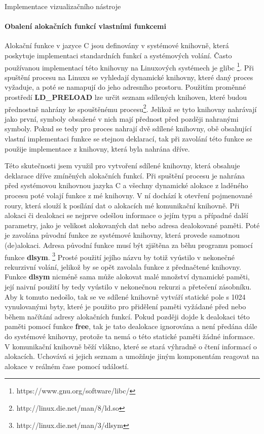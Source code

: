 \documentclass[czech,bachelor,male,python,dept460]{diploma}						%
\newcommand{\parspace}[1][]{
	\ifthenelse{\isempty{#1}}{\vspace{5mm}}{\vspace{#1}}
	\par
}
\begin{document}
\begin{section}{Implementace vizualizačního nástroje}
				\paragraph*{Obalení alokačních funkcí vlastními funkcemi} Alokační funkce v jazyce C jsou definovány v systémové knihovně, která poskytuje
				implementaci standardních funkcí a systémových volání. Často používanou implementací této knihovny na Linuxových systémech je glibc
				\footnote{https://www.gnu.org/software/libc/}. Při spuštění procesu na Linuxu se vyhledají dynamické knihovny, které daný proces vyžaduje,
				a poté se namapují do jeho adresního prostoru. Použitím proměnné prostředí \textbf{LD\_PRELOAD} lze určit
				seznam sdílených knihoven, které budou přednostně nahrány ke spouštěnému procesu\footnote{http://linux.die.net/man/8/ld.so}.
				Jelikož se tyto knihovny nahrávají jako první, symboly obsažené v nich mají přednost před později nahranými symboly. Pokud se tedy pro proces
				nahrají dvě sdílené knihovny, obě obsahující vlastní implementaci funkce se stejnou deklarací, tak při zavolání této funkce se použije
				implementace z knihovny, která byla nahrána dříve.
				
				\parspace Této skutečnosti jsem využil pro vytvoření sdílené knihovny, která obsahuje deklarace dříve zmíněných alokačních funkcí.
				Při spuštění procesu je nahrána před systémovou knihovnou jazyka C a všechny dynamické alokace z laděného procesu poté volají funkce z mé knihovny.
				V ní dochází k otevření pojmenované roury, která slouží k posílání dat o alokacích mé komunikační knihovně.
				Při alokaci či dealokaci se nejprve odešlou informace o jejím typu a případné další parametry, jako je velikost alokovaných dat
				nebo adresa dealokované paměti. Poté je zavolána původní funkce ze systémové knihovny, která provede samotnou (de)alokaci.
				Adresa původní funkce musí být zjištěna za běhu programu pomocí
				funkce \textbf{dlsym}. \footnote{http://linux.die.net/man/3/dlsym} Prosté použití jejího názvu by totiž vyústilo v nekonečné rekurzivní volání, jelikož
				by se opět zavolala funkce z přednačtené knihovny. Funkce \textbf{dlsym} nicméně sama může alokovat malé množství dynamické paměti,
				její naivní použití by tedy vyústilo v nekonečnou rekurzi a přetečení zásobníku.
				Aby k tomuto nedošlo, tak se ve sdílené knihovně vytváří statické pole s 1024 vynulovanými
				byty, které je použito pro přidělení paměti vyžádané před nebo během načítání adresy alokačních funkcí. Pokud později dojde k dealokaci této
				paměti pomocí funkce \textbf{free}, tak je tato dealokace ignorována a není předána dále do systémové knihovny, protože ta nemá o této statické paměti
				žádné informace. V komunikační knihovně běží vlákno, které se stará výhradně o čtení informací o alokacích. Uchovává si jejich seznam
				a umožňuje jiným komponentám reagovat na alokace v reálném čase pomocí událostí.
				

\end{section}
\end{document}
